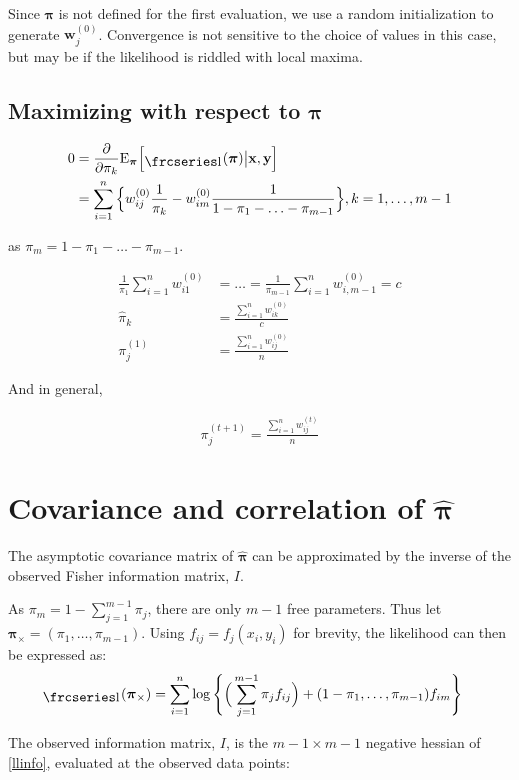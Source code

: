 \documentclass[12pt]{amsart}
\newcommand{\textfrc}[1]{{\frcseries#1}}
\newcommand{\mathfrc}[1]{\raisebox{-0.8mm}{\text{\textfrc{\small #1}}}\hspace{0.4mm}}
\newcommand{\vect}[1]{\boldsymbol{\mathbf{#1}}}
\newcommand{\eqn}[1]{\begin{align*}
#1
\end{align*}}
\newcommand{\eqnl}[2]{\begin{align} \label{#1}
#2
\end{align}}
\newcommand{\Bl}{\Big\{}
\newcommand{\Br}{\Big\}}
\newcommand{\vp}{\vect{\pi}}
\newcommand{\vph}{\hat{\vect{\pi}}}
\newcommand{\llp}{\mathfrc{l}(\vect{\pi})}
\newcommand{\pims}{1-\pi_1,\ldots,\pi_{m-1}}
\newcommand{\sumn}{\sum^n_{i=1}}
\newcommand{\summo}{\sum^{m-1}_{j=1}}
\newcommand{\vpg}{\vp_{\times}}
\newcommand{\llpp}{\mathfrc{l}(\vpg)}
\begin{document}
Since $\vp$ is not defined for the first evaluation, we use a random initialization to generate $\vect{w}_{j}^{(0)}$. Convergence is not sensitive to the choice of values in this case, but may be if the likelihood is riddled with local maxima.

\subsection{Maximizing with respect to $\vp$}
\eqn{
	0 &= \frac{\partial}{\partial \pi_k} \text{E}_{\vect{\pi}}\Big[\llp \big| \vect{x},\vect{y}\Big]    \\
	& =      \sumn \Bl  w^{(0)}_{ij} \frac{1}{\pi_k} - w^{(0)}_{im} \frac{1}{1-\pi_1-\ldots-\pi_{m-1}}   \Br, k=1,\ldots,m-1
}

as $\pi_m = 1 - \pi_1 - \ldots - \pi_{m-1}$.


\eqn{
	\frac{1}{\pi_1} \sumn w^{(0)}_{i1} &= \ldots = \frac{1}{\pi_{m-1}} \sumn w^{(0)}_{i,m-1} = c	\\
	\hat{\pi}_k &= \frac{\sumn w^{(0)}_{ik}}{c}		\\
	\pi^{(1)}_j &= \frac{\sumn w^{(0)}_{ij}}{n}
}

And in general,


\eqn{
	\pi^{(t+1)}_j = \frac{\sumn w^{(t)}_{ij}}{n}
}




















\clearpage
\section{Covariance and correlation of $\vph$}
The asymptotic covariance matrix of $\vph$ can be approximated by the inverse of the observed Fisher information matrix, $I$.

As $\pi_m = 1-\sum_{j=1}^{m-1}\pi_j$, there are only $m-1$ free parameters. Thus let $\vpg=(\pi_1,\ldots,\pi_{m-1})$. Using $f_{ij} = f_j(x_i,y_i)$ for brevity, the likelihood can then be expressed as:
\eqnl{llinfo}{
	\llpp &= \sumn \log \Bigg\{ \Big( \summo \pi_{j} f_{ij} \Big) + (\pims)f_{im} \Bigg\}	
}



The observed information matrix, $I$, is the $m-1\times m-1$ negative hessian of \eqref{llinfo}, evaluated at the observed data points:
\end{document}
